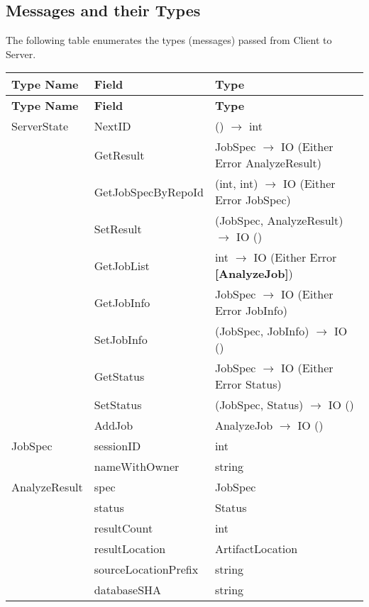 \documentclass[11pt]{article}
\begin{document}
\subsection{Messages and their Types}
\label{sec:msg-types}
The following table enumerates the types (messages) passed from Client to Server.

\begin{longtable}{|p{5cm}|p{5cm}|p{5cm}|}
  \hline
  \rowcolor{gray!20} \textbf{Type Name} & \textbf{Field} & \textbf{Type} \\
  \hline
  \endfirsthead

  \hline
  \rowcolor{gray!20} \textbf{Type Name} & \textbf{Field} & \textbf{Type} \\
  \hline
  \endhead

  \hline
  \endfoot

  \hline
  \endlastfoot

  ServerState & NextID & () $\rightarrow$ int \\
                                        & GetResult & JobSpec $\rightarrow$ IO (Either Error AnalyzeResult) \\
                                        & GetJobSpecByRepoId & (int, int) $\rightarrow$ IO (Either Error JobSpec) \\
                                        & SetResult & (JobSpec, AnalyzeResult) $\rightarrow$ IO () \\
                                        & GetJobList & int $\rightarrow$ IO (Either Error \textbf{[AnalyzeJob]}) \\
                                        & GetJobInfo & JobSpec $\rightarrow$ IO (Either Error JobInfo) \\
                                        & SetJobInfo & (JobSpec, JobInfo) $\rightarrow$ IO () \\
                                        & GetStatus & JobSpec $\rightarrow$ IO (Either Error Status) \\
                                        & SetStatus & (JobSpec, Status) $\rightarrow$ IO () \\
                                        & AddJob & AnalyzeJob $\rightarrow$ IO () \\

  \hline
  JobSpec & sessionID & int \\
                                        & nameWithOwner & string \\

  \hline
  AnalyzeResult & spec & JobSpec \\
                                        & status & Status \\
                                        & resultCount & int \\
                                        & resultLocation & ArtifactLocation \\
                                        & sourceLocationPrefix & string \\
                                        & databaseSHA & string \\


\end{longtable}
\end{document}
